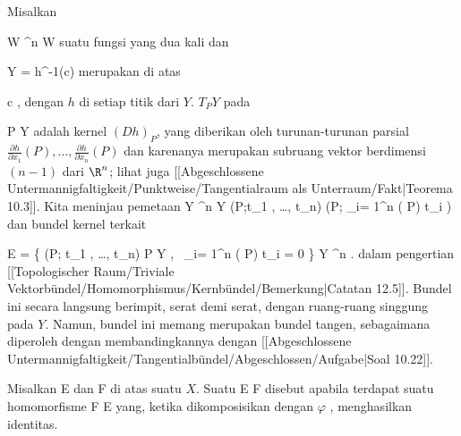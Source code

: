{

Misalkan

\mavergleichskette
{\vergleichskette
{ W
}
{ \subseteq }{ \R^n
}
{  }{
}
{    }{
}
{   }{
}
}
{}{}{}
 { W } { \R
} {}
suatu fungsi yang dua kali
dan

\mavergleichskette
{\vergleichskette
{ Y
}
{ = }{ h^{-1}(c)
}
{  }{
}
{    }{
}
{   }{
}
}
{}{}{}
merupakan
di atas

\mavergleichskette
{\vergleichskette
{ c
}
{ \in }{ \R
}
{  }{
}
{    }{
}
{   }{
}
}
{}{}{,}
dengan $h$
di setiap titik dari $Y$. 
$T_PY$ pada

\mavergleichskette
{\vergleichskette
{ P
}
{ \in }{ Y
}
{  }{
}
{    }{
}
{   }{
}
}
{}{}{}
adalah kernel
$\left(D h \right)_{ P}$, yang diberikan oleh turunan-turunan parsial ${ \frac{   \partial   h   }{  \partial   x_1   } } ( P) , \ldots , { \frac{   \partial   h   }{  \partial   x_n   } } ( P)$ dan karenanya merupakan subruang vektor berdimensi $(n-1)$ dari $\R^n$; lihat juga
[[Abgeschlossene Untermannigfaltigkeit/Punktweise/Tangentialraum als Unterraum/Fakt|Teorema 10.3]].
Kita meninjau pemetaan
\maabbeledisp {} {Y \times \R^n } { Y \times \R
} {(P;t_1 , \ldots , t_n) } { (P; \sum_{i= 1}^n {  } ( P)  t_i )
} {}
dan bundel kernel terkait

\mavergleichskettedisp
{\vergleichskette
{ E
}
{ =} { \left\{  (P; t_1 , \ldots , t_n)  \mid   P \in Y , \,  \sum_{i= 1}^n {  } ( P) t_i = 0       \right\}
}
{ \subseteq} { Y \times \R^n
}
{ } {
}
{ } {
}
}
{}{}{.}
dalam pengertian
[[Topologischer Raum/Triviale Vektorbündel/Homomorphismus/Kernbündel/Bemerkung|Catatan 12.5]].
Bundel ini secara langsung berimpit, serat demi serat, dengan ruang-ruang singgung pada $Y$. Namun, bundel ini memang merupakan bundel tangen, sebagaimana diperoleh dengan membandingkannya dengan
[[Abgeschlossene Untermannigfaltigkeit/Tangentialbündel/Abgeschlossen/Aufgabe|Soal 10.22]].

}

{}
{

Misalkan
\mathkor {} {E} {dan} {F} {}
di atas suatu
$X$. Suatu
\maabb {\varphi} { E } { F
} {}
disebut
apabila terdapat suatu homomorfisme
\maabb {\psi} { F } { E
} {}
yang, ketika dikomposisikan dengan $\varphi$
 {} {}, menghasilkan identitas.

}

